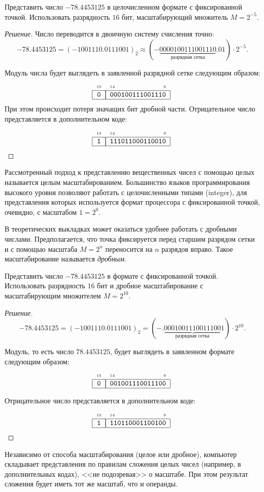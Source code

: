 \begin{Example}
    Представить число $-78.4453125$ в целочисленном формате с фиксированной точкой. Использовать разрядность $16$ бит, масштабирующий множитель $M=2^{-5}$.
\end{Example}
\begin{proof}[Решение]
    Число переводится в двоичную систему счисления точно:
    \[-78.4453125 = (-1001110.0111001)_2 \approx (-\underbrace{0000100111001110}_\text{разрядная сетка}.01)\cdot 2^{-5}.\]
    
    Модуль числа будет выглядеть в заявленной разрядной сетке следующим образом:
    \[
        \FixedTwoBytes{0}{000100111001110}
    \]
    При этом происходит потеря значащих бит дробной части. Отрицательное число представляется в дополнительном коде:
    \[
        \FixedTwoBytes{1}{111011000110010}
    \]
\end{proof}

Рассмотренный подход к представлению вещественных чисел с помощью целых называется целым масштабированием. Большинство языков программирования высокого уровня позволяют работать с целочисленными типами (integer), для представления которых используется формат процессора с фиксированной точкой, очевидно, с масштабом $1=2^0$. 

В теоретических выкладках может оказаться удобнее работать с дробными числами. Предполагается, что точка фиксируется перед старшим разрядом сетки и с помощью масштаба $M=2^n$ переносится на $n$ разрядов вправо. Такое масштабирование называется \emph{дробным}.

\begin{Example}
    Представить число $-78.4453125$ в формате с фиксированной точкой. Использовать разрядность $16$ бит и дробное масштабирование с масштабирующим множителем $M=2^{10}$.
\end{Example}
\begin{proof}[Решение]
    \[-78.4453125 = (-1001110.0111001)_2=(-.\underbrace{0001001110011100}_\text{разрядная сетка}1)\cdot 2^{10}.\]
    
    Модуль, то есть число $78.4453125$, будет выглядеть в заявленном формате следующим образом:
    \[
        \FixedTwoBytes{0}{001001110011100}
    \]
    
    Отрицательное число представляется в дополнительном коде:
    \[
        \FixedTwoBytes{1}{110110001100100}
    \]
\end{proof}

Независимо от способа масштабирования (целое или дробное), компьютер складывает представления по правилам сложения целых чисел (например, в дополнительных кодах), <<не подозревая>> о масштабе. При этом результат сложения будет иметь тот же масштаб, что и операнды.

